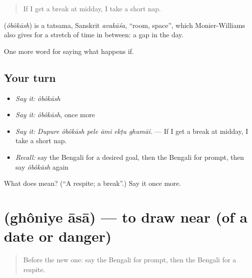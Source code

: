 \begin{quote}
If I get a break at midday, I take a short nap.
\end{quote}

\begin{cousinweb}
\textbf{} (\emph{ôbôkāsh}) is a tatsama, Sanskrit \emph{avakāśa}, \textquotedblleft{}room, space\textquotedblright{}, which Monier-Williams also gives for a stretch of time in between: a gap in the day.
\end{cousinweb}

\begin{grammarlens}[title={What you've built}]
One more word for saying what happens if.
\end{grammarlens}

\subsection*{Your turn}
\begin{itemize}
\raggedright
  \item \emph{Say it:} \emph{ôbôkāsh}
  \item \emph{Say it:} \emph{ôbôkāsh}, once more
  \item \emph{Say it:} \emph{Dupure ôbôkāsh pele āmi ekṭu ghumāi.} — If I get a break at midday, I take a short nap.
  \item \emph{Recall:} say the Bengali for a desired goal, then the Bengali for prompt, then say \emph{ôbôkāsh} again
\end{itemize}

\begin{tcolorbox}[breakable,colback=teal!4,colframe=teal!35!black,title={Before you move on}]
What does  mean? (\textquotedblleft{}A respite; a break\textquotedblright{}.) Say it once more.
\end{tcolorbox}
\section[\texorpdfstring{\bn{ঘনিয়ে} \bn{আসা} (ghôniye āsā)}{ঘনিয়ে আসা (ghôniye āsā)}]{  (ghôniye āsā) — to draw near (of a date or danger)}

\label{lesson:BN-C544-ghoniye-asa}



\begin{quote}
Before the new one: say the Bengali for prompt, then the Bengali for a respite.
\end{quote}

